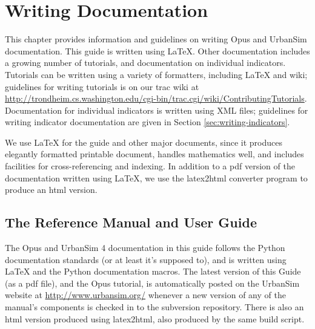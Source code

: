 
\chapter{Writing Documentation}

This chapter provides information and guidelines on writing Opus and
UrbanSim documentation.  This guide is written using \LaTeX{}.\latexindex
Other documentation includes a growing number of tutorials, and
documentation on individual indicators.  Tutorials can be written using a
variety of formatters, including \LaTeX{} and wiki; guidelines for writing
tutorials is on our trac wiki at
\url{http://trondheim.cs.washington.edu/cgi-bin/trac.cgi/wiki/ContributingTutorials}.
Documentation for individual indicators is written using XML files;
guidelines for writing indicator documentation are given in Section
\ref{sec:writing-indicators}.

We use \LaTeX{} for the guide and other major documents,
since it produces elegantly formatted printable document, handles
mathematics well, and includes facilities for cross-referencing and
indexing.  In addition to a pdf version of the documentation written using
\LaTeX{}, we use the latex2html 
converter program to produce an html version.

\section{The Reference Manual and User Guide}

The Opus and UrbanSim 4 documentation in this guide follows the Python
\pythonindex documentation standards (or at least it's supposed to), and is
written using \LaTeX{} \latexindex and the Python \pythonindex
documentation macros.  The latest version of this Guide (as a pdf file),
and the Opus tutorial, is automatically posted on the UrbanSim website at
\url{http://www.urbansim.org/} whenever a new version of any of the
manual's components is checked in to the subversion repository.  There is
also an html version produced using latex2html, also produced by the same
build script.

